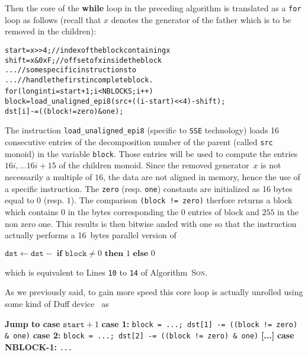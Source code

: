 \documentclass[reqno,11pt]{amsart}
\theoremstyle{plain}
\theoremstyle{definition}
\newcommand{\SSE}{\texttt{SSE}\xspace}
\renewcommand{\tt}[1]{\texttt{#1}}
\begin{document}
Then the core of the \textbf{while} loop in the preceding algorithm is
translated as a \texttt{for} loop as follows (recall that $x$ denotes the generator of
the father which is to be removed in the children):
{
\small
\begin{alltt}
start = x >> 4;      // index of the block containing x
shift = x & 0xF;     // offset of x inside the block
...                  // some specific instructions to
...                  // handle the first incomplete block.
for (long int i=start+1; i<NBLOCKS; i++) {
  block = load_unaligned_epi8(src + ((i-start)<<4) - shift);
  dst[i] -= ((block != zero) & one);
}
\end{alltt}
}
The instruction \tt{load\_unaligned\_epi8} (specific to \SSE technology) loads
 16 consecutive entries of the decomposition number
of the parent (called \tt{src} monoid) in the variable \tt{block}.
Those entries will be used to compute
the entries $16i, \dots 16i+15$ of the children monoid. Since the removed
generator~$x$ is not necessarily a multiple of $16$, the data are not aligned
in memory, hence the use of a specific instruction. The \tt{zero}
(resp. \tt{one}) constants are initialized as 16 bytes equal to $0$
(resp. $1$). The comparison \tt{(block != zero)} therfore returns a block
which contains $0$ in the bytes corresponding the $0$ entries of block and
$255$ in the non zero one. This results is then bitwise anded with one so that
the instruction actually performs a 16~bytes parallel version of


\begin{center}
$\tt{dst} \gets \tt{dst} -
\textbf{ if } \tt{block} \neq 0 \textbf{ then } 1 \textbf{ else } 0$
\end{center}

which is equivalent to Lines \tt{10} to \tt{14} of Algorithm~\textsc{Son}.
\medskip

As we previously said, to gain more speed this core loop is actually unrolled
using some kind of Duff device~\cite{WikipediaDuff} as

{\small
\begin{algorithmic}
\State \textbf{Jump to case } $\tt{start}+1$
\State \textbf{case 1:} \tt{block = ...; dst[1] -= ((block != zero) \& one)}
\State \textbf{case 2:} \tt{block = ...; dst[2] -= ((block != zero) \& one)}
\State \textbf{[...]}
\State \textbf{case NBLOCK-1:} \tt{...}
\end{algorithmic}}

\end{document}
